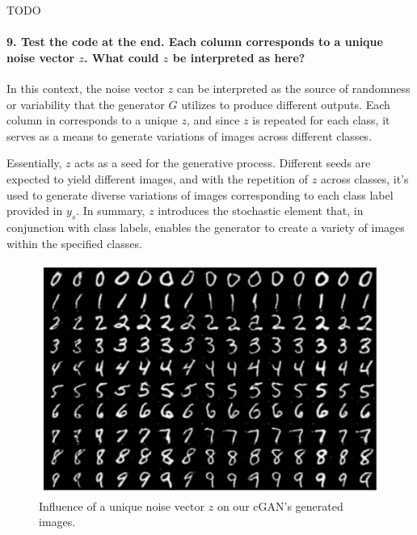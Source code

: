 TODO


\paragraph*{9. Test the code at the end. Each column corresponds to a unique noise vector $z$. What could $z$ be interpreted as here?}

In this context, the noise vector $z$ can be interpreted as the source of randomness or variability that the generator $G$ utilizes to produce different outputs. Each column in  corresponds to a unique $z$, and since $z$ is repeated for each class, it serves as a means to generate variations of images across different classes.

Essentially, $z$ acts as a seed for the generative process. Different seeds are expected to yield different images, and with the repetition of $z$ across classes, it's used to generate diverse variations of images corresponding to each class label provided in $y_s$. In summary, $z$ introduces the stochastic element that, in conjunction with class labels, enables the generator to create a variety of images within the specified classes.

\begin{figure}[H]
    \centering
    \includegraphics[width=.8\textwidth]{impact_of_z}
    \caption{Influence of a unique noise vector $z$ on our cGAN's generated images.}
    \label{fig:impact_of_z}
\end{figure}